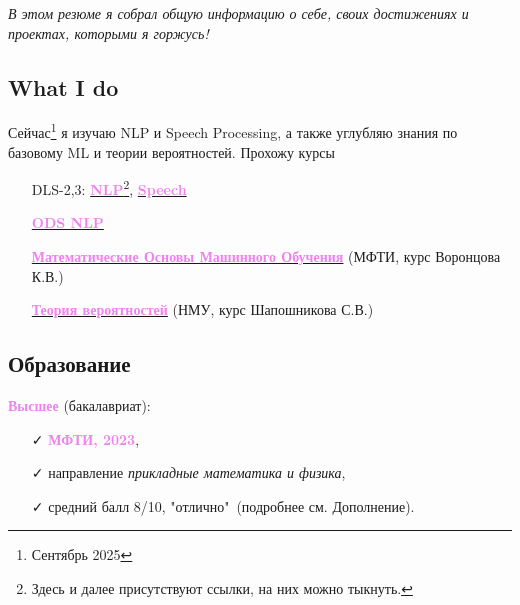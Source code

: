 \documentclass[a4paper,12pt]{article}
\begin{document}
	\vspace{0.5cm}
	
	\begin{tcolorbox}[myblock]
		\selectfont\fontsize{15}{15}\textit{В этом резюме я собрал общую информацию о себе, своих достижениях и проектах, которыми я горжусь!}
	\end{tcolorbox}
	\vspace{5pt}
	
	\subsection*{What I do}
	Сейчас\footnote{Сентябрь 2025} я изучаю NLP и Speech Processing, а также углубляю знания по базовому ML и теории вероятностей. Прохожу курсы
	\begin{itemize}
	\item[\faArrowRight] DLS-2,3: \href{https://stepik.org/course/251729/syllabus}{\textcolor{violet}{\textbf{NLP}}}\footnote{Здесь и далее присутствуют ссылки, на них можно тыкнуть.}, \href{https://stepik.org/course/251868/syllabus}{\textcolor{violet}{\textbf{Speech}}}
	\item[\faArrowRight] \href{https://ods.ai/tracks/nlp-course-autumn-2025}{\textcolor{violet}{\textbf{ODS NLP}}}
	\item[\faArrowRight] \href{http://www.machinelearning.ru/wiki/index.php?title=%D0%9C%D0%B0%D1%88%D0%B8%D0%BD%D0%BD%D0%BE%D0%B5_%D0%BE%D0%B1%D1%83%D1%87%D0%B5%D0%BD%D0%B8%D0%B5_%28%D0%BA%D1%83%D1%80%D1%81_%D0%BB%D0%B5%D0%BA%D1%86%D0%B8%D0%B9%2C_%D0%9A.%D0%92.%D0%92%D0%BE%D1%80%D0%BE%D0%BD%D1%86%D0%BE%D0%B2%29}{\textcolor{violet}{\textbf{Математические Основы Машинного Обучения}}} (МФТИ, курс Воронцова К.В.)
	\item[\faArrowRight] \href{https://mccme.ru/ru/nmu/courses-of-nmu/osen-20252026/nmu_autumn2025_terver/}{\textcolor{violet}{\textbf{Теория вероятностей}}} (НМУ, курс Шапошникова С.В.)	
	\end{itemize}

	
	\subsection*{Образование}
	\textcolor{violet}{\textbf{Высшее}} (бакалавриат): 
	\begin{itemize}
		\item[\faCheck] \textcolor{violet}{\textbf{МФТИ, 2023}},
		\item[\faCheck] направление \textit{прикладные математика и физика}, 
		\item[\faCheck] средний балл 8/10, "отлично"\ (подробнее см. Дополнение).
	\end{itemize}
	
\end{document}
